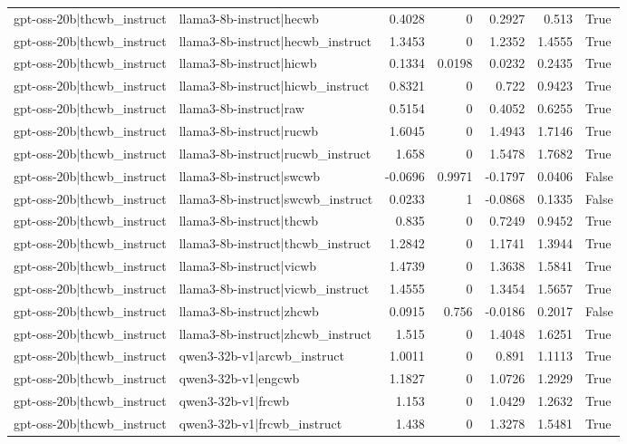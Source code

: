 \begin{table}
\begin{tabular}{l l r r r r l}
gpt-oss-20b|thcwb_instruct & llama3-8b-instruct|hecwb & 0.4028 & 0 & 0.2927 & 0.513 & True \\
gpt-oss-20b|thcwb_instruct & llama3-8b-instruct|hecwb_instruct & 1.3453 & 0 & 1.2352 & 1.4555 & True \\
gpt-oss-20b|thcwb_instruct & llama3-8b-instruct|hicwb & 0.1334 & 0.0198 & 0.0232 & 0.2435 & True \\
gpt-oss-20b|thcwb_instruct & llama3-8b-instruct|hicwb_instruct & 0.8321 & 0 & 0.722 & 0.9423 & True \\
gpt-oss-20b|thcwb_instruct & llama3-8b-instruct|raw & 0.5154 & 0 & 0.4052 & 0.6255 & True \\
gpt-oss-20b|thcwb_instruct & llama3-8b-instruct|rucwb & 1.6045 & 0 & 1.4943 & 1.7146 & True \\
gpt-oss-20b|thcwb_instruct & llama3-8b-instruct|rucwb_instruct & 1.658 & 0 & 1.5478 & 1.7682 & True \\
gpt-oss-20b|thcwb_instruct & llama3-8b-instruct|swcwb & -0.0696 & 0.9971 & -0.1797 & 0.0406 & False \\
gpt-oss-20b|thcwb_instruct & llama3-8b-instruct|swcwb_instruct & 0.0233 & 1 & -0.0868 & 0.1335 & False \\
gpt-oss-20b|thcwb_instruct & llama3-8b-instruct|thcwb & 0.835 & 0 & 0.7249 & 0.9452 & True \\
gpt-oss-20b|thcwb_instruct & llama3-8b-instruct|thcwb_instruct & 1.2842 & 0 & 1.1741 & 1.3944 & True \\
gpt-oss-20b|thcwb_instruct & llama3-8b-instruct|vicwb & 1.4739 & 0 & 1.3638 & 1.5841 & True \\
gpt-oss-20b|thcwb_instruct & llama3-8b-instruct|vicwb_instruct & 1.4555 & 0 & 1.3454 & 1.5657 & True \\
gpt-oss-20b|thcwb_instruct & llama3-8b-instruct|zhcwb & 0.0915 & 0.756 & -0.0186 & 0.2017 & False \\
gpt-oss-20b|thcwb_instruct & llama3-8b-instruct|zhcwb_instruct & 1.515 & 0 & 1.4048 & 1.6251 & True \\
gpt-oss-20b|thcwb_instruct & qwen3-32b-v1|arcwb_instruct & 1.0011 & 0 & 0.891 & 1.1113 & True \\
gpt-oss-20b|thcwb_instruct & qwen3-32b-v1|engcwb & 1.1827 & 0 & 1.0726 & 1.2929 & True \\
gpt-oss-20b|thcwb_instruct & qwen3-32b-v1|frcwb & 1.153 & 0 & 1.0429 & 1.2632 & True \\
gpt-oss-20b|thcwb_instruct & qwen3-32b-v1|frcwb_instruct & 1.438 & 0 & 1.3278 & 1.5481 & True \\

\end{tabular}
\end{table}
